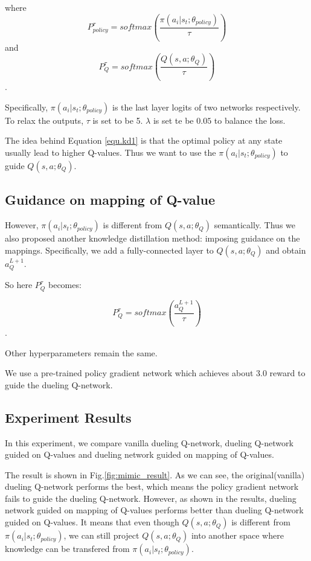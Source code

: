 \noindent
where 
$$P^{\tau}_{policy} = softmax(\frac{\pi(a_i|s_t;\theta_{policy})}{\tau})$$
and  
$$P^{\tau}_{Q} = softmax( \frac{Q(s,a;\theta_{Q})} {\tau} )$$.

\noindent
Specifically, $\pi(a_i|s_t;\theta_{policy})$ is the last layer logits of two networks respectively. To relax the outputs, $\tau$ is set to be 5. $\lambda$ is set te be $0.05$ to balance the loss.

The idea behind Equation \ref{equ.kd1} is that the optimal policy at any state usually lead to higher Q-values. Thus we want to use the $\pi(a_i|s_t;\theta_{policy})$ to guide $Q(s,a;\theta_{Q})$.

\subsection{Guidance on mapping of Q-value}
However,  $\pi(a_i|s_t;\theta_{policy})$ is different from $Q(s,a;\theta_{Q})$ semantically. Thus we also proposed another knowledge distillation method: imposing guidance on the mappings.
%
Specifically, we add a fully-connected layer to $Q(s,a;\theta_{Q})$ and obtain  $a^{L+1}_{Q}$.

So here $P^{\tau}_{Q}$ becomes:

$$P^{\tau}_{Q} = softmax( \frac{a^{L+1}_{Q}} {\tau} )$$.

\noindent
Other hyperparameters remain the same.

%
We use a pre-trained policy gradient network which achieves about $3.0$ reward to guide the dueling Q-network.


\subsection{Experiment Results}

In this experiment, we compare vanilla dueling Q-network, dueling Q-network guided on Q-values and dueling network guided on mapping of Q-values.

The result is shown in Fig.\ref{fig:mimic_result}. As we can see, the original(vanilla) dueling Q-network performs the best, which means the policy gradient network fails to guide the dueling Q-network.
%
However, as shown in the results, dueling network guided on mapping of Q-values performs better than dueling Q-network guided on Q-values. It means that even though $Q(s,a;\theta_{Q})$ is different from $\pi(a_i|s_t;\theta_{policy})$, we can still project $Q(s,a;\theta_{Q})$ into another space where knowledge can be transfered from $\pi(a_i|s_t;\theta_{policy})$.


